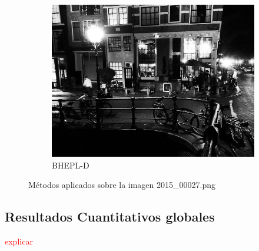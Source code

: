 \documentclass[sigchi]{acmart}
\newcommand{\rojo}[1]{\textcolor{red}{#1}}
\begin{document}
\begin{figure}[htbp]
	\begin{subfigure}[b]{0.28\textwidth}
		\centering
		\includegraphics[width=\linewidth]{./procesadas/2015_00027/2015_00027_bhepl_d.png}
		\caption{BHEPL-D}
	\end{subfigure}

	\caption{Métodos aplicados sobre la imagen 2015\_00027.png}
	\label{fig:visual_027}
\end{figure}

\newpage

\subsection{Resultados Cuantitativos globales}
\label{subsec:resultados_cuantitativos}
\rojo{explicar}
\end{document}
